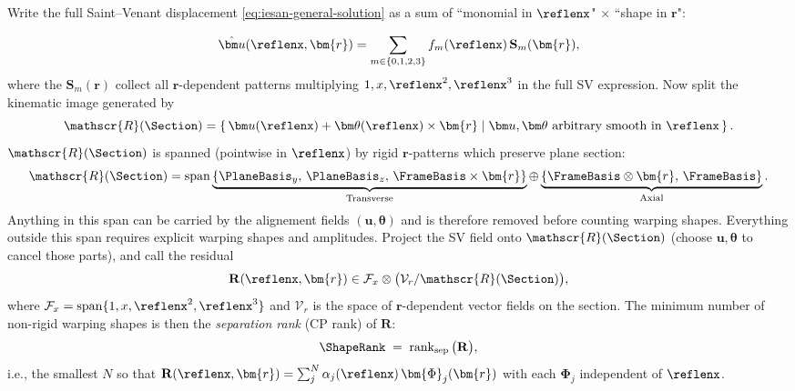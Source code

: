 Write the full Saint–Venant displacement \eqref{eq:iesan-general-solution} as a sum of ``monomial in \(\reflenx\)" \(\times\) ``shape in \(\bm{r}\)":

$$
\hat{\bm u}(\reflenx,\bm{r})=\sum_{m\in\{0,1,2,3\}} f_m(\reflenx)\,\mathbf{S}_m(\bm{r}),
$$
where the \(\mathbf{S}_m(\bm{r})\) collect all \(\bm{r}\)-dependent patterns multiplying \(1,x,\reflenx^2,\reflenx^3\) in the full SV expression. 
Now split the kinematic image generated by
$$
\mathscr{R}(\Section)=\left\{\,\bm u(\reflenx)+\bm\theta(\reflenx)\times\bm{r} \;\middle|\; \bm u,\bm\theta \text{ arbitrary smooth in } \reflenx \,\right\}.
$$
\(\mathscr{R}(\Section)\) is spanned (pointwise in \(\reflenx\)) by rigid \(\bm{r}\)-patterns which preserve plane section:
\begin{equation}
\mathscr{R}(\Section) = \operatorname{span}
\underbrace{\{ \PlaneBasis_y,\,\PlaneBasis_z,\,\FrameBasis\times\bm{r}\}}_{\text{Transverse}}
\oplus 
\underbrace{\{\FrameBasis\otimes\bm{r},\,\FrameBasis\}}_{\text{Axial}}.
\label{eq:rigid-span}
\end{equation}
Anything in this span can be carried by the alignement fields $(\bm{u}, \bm{\theta})$ and is therefore removed before counting warping shapes. Everything outside this span requires explicit warping shapes and amplitudes.
Project the SV field onto \(\mathscr{R}(\Section)\) (choose \(\bm u,\bm\theta\) to cancel those parts), and call the residual
$$
\mathbf{R}(\reflenx,\bm{r}) \in \mathcal{F}_x \otimes \big(\mathcal{V}_r / \mathscr{R}(\Section)\big),
$$
where \(\mathcal{F}_x=\mathrm{span}\{1,x,\reflenx^2,\reflenx^3\}\) and \(\mathcal{V}_r\) is the space of \(\bm{r}\)-dependent vector fields on the section. 
%
The minimum number of non-rigid warping shapes is then the \emph{separation rank} (CP rank) of \(\mathbf{R}\):
$$
\ShapeRank \;=\; \operatorname{rank}_\text{sep}\big(\mathbf{R}\big),
$$
i.e., the smallest \(N\) so that \(\mathbf{R}(\reflenx,\bm{r})=\sum_{j}^N \alpha_j(\reflenx)\,\bm{\Phi}_j(\bm{r})\) with each \(\bm{\Phi}_j\) independent of \(\reflenx\).



